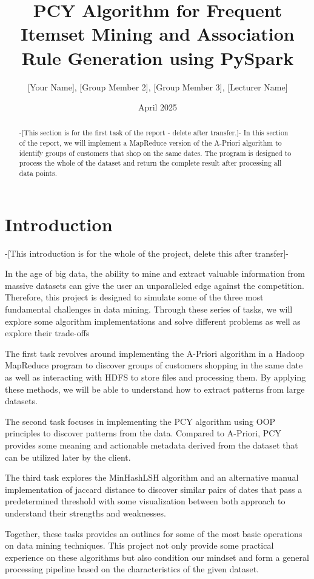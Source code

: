 \documentclass{article}
\title{PCY Algorithm for Frequent Itemset Mining and Association Rule Generation using PySpark}
\author{[Your Name], [Group Member 2], [Group Member 3], [Lecturer Name]}
\date{April 2025}
\begin{document}
\maketitle

\section{Introduction}
-[This introduction is for the whole of the project, delete this after transfer]-

In the age of big data, the ability to mine and extract valuable information from massive datasets can give the user an unparalleled edge against the competition. Therefore, this project is designed to simulate some of the three most fundamental challenges in data mining. Through these series of tasks, we will explore some algorithm implementations and solve different problems as well as explore their trade-offs 

The first task revolves around implementing the A-Priori algorithm in a Hadoop MapReduce program to discover groups of customers shopping in the same date as well as interacting with HDFS to store files and processing them. By applying these methods, we will be able to understand how to extract patterns from large datasets.

The second task focuses in implementing the PCY algorithm using OOP principles to discover patterns from the data. Compared to A-Priori, PCY provides some meaning and actionable metadata derived from the dataset that can be utilized later by the client.

The third task explores the MinHashLSH algorithm and an alternative manual implementation of jaccard distance to discover similar pairs of dates that pass a predetermined threshold with some visualization between both approach to understand their strengths and weaknesses.

Together, these tasks provides an outlines for some of the most basic operations on data mining techniques. This project not only provide some practical experience on these algorithms but also condition our mindset and form a general processing pipeline based on the characteristics of the given dataset. 


\begin{abstract}
-[This section is for the first task of the report - delete after transfer.]-
In this section of the report, we will implement a MapReduce version of the A-Priori algorithm to identify groups of customers that shop on the same dates. The program is designed to process the whole of the dataset and return the complete result after processing all data points.


\end{abstract}
\end{document}
